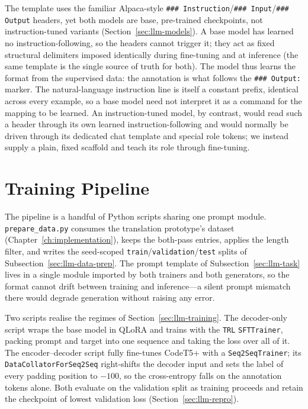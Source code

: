 The template uses the familiar Alpaca-style \texttt{\#\#\# Instruction}/\texttt{\#\#\# Input}/\texttt{\#\#\# Output} headers, yet both models are base, pre-trained checkpoints, not instruction-tuned variants (Section~\ref{sec:llm-models}).
A base model has learned no instruction-following, so the headers cannot trigger it; they act as fixed structural delimiters imposed identically during fine-tuning and at inference (the same template is the single source of truth for both).
The model thus learns the format from the supervised data: the annotation is what follows the \texttt{\#\#\# Output:} marker.
The natural-language instruction line is itself a constant prefix, identical across every example, so a base model need not interpret it as a command for the mapping to be learned.
An instruction-tuned model, by contrast, would read such a header through its own learned instruction-following and would normally be driven through its dedicated chat template and special role tokens; we instead supply a plain, fixed scaffold and teach its role through fine-tuning.

\section{Training Pipeline}
\label{sec:llm-pipeline}
The pipeline is a handful of Python scripts sharing one prompt module.
\texttt{prepare\_data.py} consumes the translation prototype's dataset (Chapter~\ref{ch:implementation}), keeps the both-pass entries, applies the length filter, and writes the seed-scoped \texttt{train}/\texttt{validation}/\texttt{test} splits of Subsection~\ref{sec:llm-data-prep}.
The prompt template of Subsection~\ref{sec:llm-task} lives in a single module imported by both trainers and both generators, so the format cannot drift between training and inference---a silent prompt mismatch there would degrade generation without raising any error.

Two scripts realise the regimes of Section~\ref{sec:llm-training}.
The decoder-only script wraps the base model in QLoRA and trains with the \texttt{TRL} \texttt{SFTTrainer}, packing prompt and target into one sequence and taking the loss over all of it.
The encoder--decoder script fully fine-tunes CodeT5+ with a \texttt{Seq2SeqTrainer}; its \texttt{DataCollatorForSeq2Seq} right-shifts the decoder input and sets the label of every padding position to $-100$, so the cross-entropy falls on the annotation tokens alone.
Both evaluate on the validation split as training proceeds and retain the checkpoint of lowest validation loss (Section~\ref{sec:llm-repro}).

